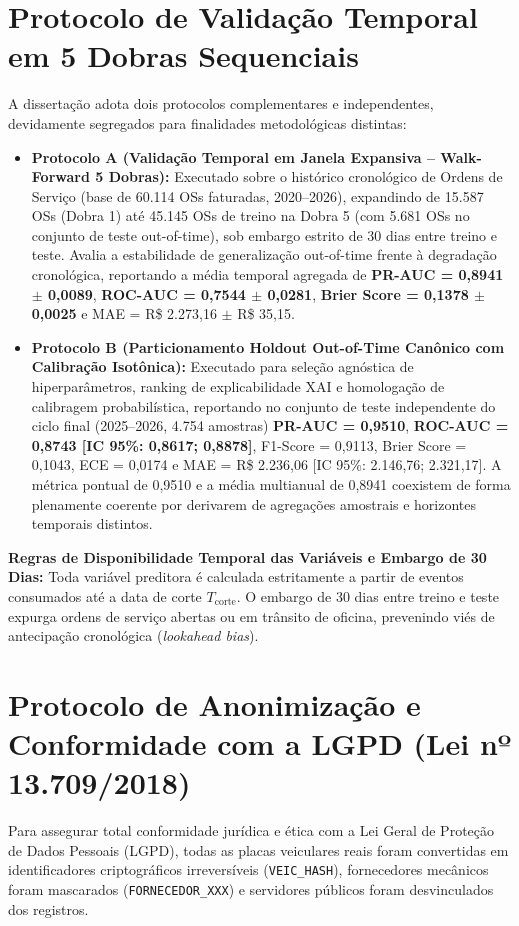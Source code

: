 \section{Protocolo de Validação Temporal em 5 Dobras Sequenciais}

A dissertação adota dois protocolos complementares e independentes, devidamente segregados para finalidades metodológicas distintas:
\begin{itemize}
    \item \textbf{Protocolo A (Validação Temporal em Janela Expansiva -- Walk-Forward 5 Dobras):} Executado sobre o histórico cronológico de Ordens de Serviço (base de 60.114 OSs faturadas, 2020--2026), expandindo de 15.587 OSs (Dobra 1) até 45.145 OSs de treino na Dobra 5 (com 5.681 OSs no conjunto de teste out-of-time), sob embargo estrito de 30 dias entre treino e teste. Avalia a estabilidade de generalização out-of-time frente à degradação cronológica, reportando a média temporal agregada de \textbf{PR-AUC = 0,8941 $\pm$ 0,0089}, \textbf{ROC-AUC = 0,7544 $\pm$ 0,0281}, \textbf{Brier Score = 0,1378 $\pm$ 0,0025} e MAE = R\$ 2.273,16 $\pm$ R\$ 35,15.
    
    \item \textbf{Protocolo B (Particionamento Holdout Out-of-Time Canônico com Calibração Isotônica):} Executado para seleção agnóstica de hiperparâmetros, ranking de explicabilidade XAI e homologação de calibragem probabilística, reportando no conjunto de teste independente do ciclo final (2025--2026, 4.754 amostras) \textbf{PR-AUC = 0,9510}, \textbf{ROC-AUC = 0,8743 [IC 95\%: 0,8617; 0,8878]}, F1-Score = 0,9113, Brier Score = 0,1043, ECE = 0,0174 e MAE = R\$ 2.236,06 [IC 95\%: 2.146,76; 2.321,17]. A métrica pontual de 0,9510 e a média multianual de 0,8941 coexistem de forma plenamente coerente por derivarem de agregações amostrais e horizontes temporais distintos.
\end{itemize}

\noindent\textbf{Regras de Disponibilidade Temporal das Variáveis e Embargo de 30 Dias:} Toda variável preditora é calculada estritamente a partir de eventos consumados até a data de corte $T_{\text{corte}}$. O embargo de 30 dias entre treino e teste expurga ordens de serviço abertas ou em trânsito de oficina, prevenindo viés de antecipação cronológica (\textit{lookahead bias}).

\section{Protocolo de Anonimização e Conformidade com a LGPD (Lei nº 13.709/2018)}

Para assegurar total conformidade jurídica e ética com a Lei Geral de Proteção de Dados Pessoais (LGPD), todas as placas veiculares reais foram convertidas em identificadores criptográficos irreversíveis (\texttt{VEIC\_HASH}), fornecedores mecânicos foram mascarados (\texttt{FORNECEDOR\_XXX}) e servidores públicos foram desvinculados dos registros.
